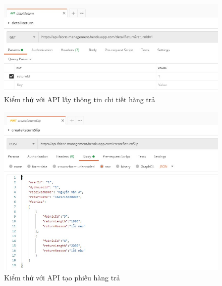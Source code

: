 \begin{figure}[H]
    \begin{center}
        \includegraphics[width=12cm]{Image/API/33_detailReturn.jpg}
        \caption{Kiểm thử với API lấy thông tin chi tiết hàng trả}
        \label{detailReturn}
    \end{center}
\end{figure}
\begin{figure}[H]
    \begin{center}
        \includegraphics[width=12cm]{Image/API/34_createReturnSlip.jpg}
        \caption{Kiểm thử với API tạo phiếu hàng trả}
        \label{createReturnSlip}
    \end{center}
\end{figure}


